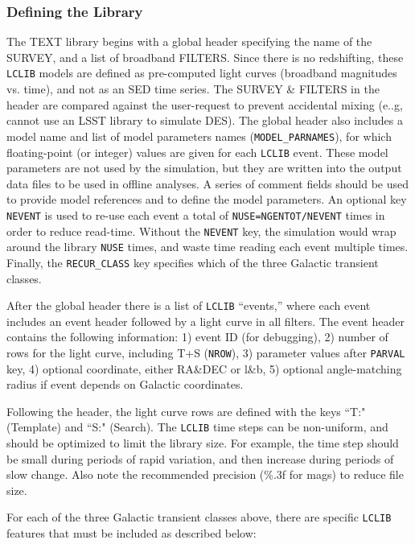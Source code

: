 \documentclass[12pt]{article}
\begin{document}
\subsubsection{Defining the Library}
\label{sss:LCLIB_define}

The TEXT library begins with a global header specifying the name of the 
SURVEY, and a list of broadband FILTERS. Since there is no redshifting,
these {\tt LCLIB}  models are defined as pre-computed light curves
(broadband magnitudes vs. time), and not as an SED time series.
The SURVEY \& FILTERS in the header are compared against the user-request 
to prevent accidental mixing (e..g, cannot use an LSST library to simulate DES).
The global header also includes a model name and list of model parameters
names ({\tt MODEL\_PARNAMES}), for which floating-point (or integer)
values are given for each {\tt LCLIB} event. These model parameters are
not used by the simulation, but  they are written into the output data files 
to be used in offline analyses.
A series of comment fields should be used to provide model references and 
to define the model parameters.
An optional key {\tt NEVENT} is used to re-use each event  a total of
{\tt NUSE=NGENTOT/NEVENT} times in order to reduce read-time. 
Without the {\tt NEVENT} key, the simulation would wrap around the 
library {\tt NUSE} times, and waste time reading each event multiple times.
Finally, the {\tt RECUR\_CLASS} key specifies which of the three 
Galactic transient classes.

After the global header there is a list of  {\tt LCLIB} ``events,'' 
where each event includes an event header followed by  a 
light curve in all filters. 
The event header  contains the following information:
1) event ID (for debugging), 
2) number of rows for the light curve, including T+S ({\tt NROW}),
3) parameter values after {\tt PARVAL} key,
4) optional coordinate, either RA\&DEC or l\&b,
5) optional angle-matching radius if event depends on Galactic coordinates.
 
Following the header, the light curve rows are defined with the keys
``T:" (Template) and ``S:" (Search). 
The {\tt LCLIB} time steps can be non-uniform, and should be optimized 
to limit the library size. For example, the time step should be small 
during periods of rapid variation, and then increase during periods 
of slow change. Also note  the recommended precision (\%.3f for mags) 
to reduce file size.

For each of the three Galactic transient classes above, 
there are specific {\tt LCLIB}
features that must be included as described below:
\end{document}
